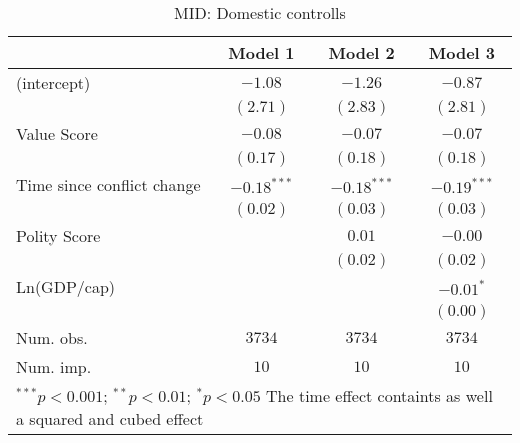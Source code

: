
\begin{table}
\begin{center}
\begin{tabular}{l c c c}
\toprule
 & Model 1 & Model 2 & Model 3 \\
\midrule
(intercept)                & $-1.08$       & $-1.26$       & $-0.87$       \\
                           & $(2.71)$      & $(2.83)$      & $(2.81)$      \\
Value Score                & $-0.08$       & $-0.07$       & $-0.07$       \\
                           & $(0.17)$      & $(0.18)$      & $(0.18)$      \\
Time since conflict change & $-0.18^{***}$ & $-0.18^{***}$ & $-0.19^{***}$ \\
                           & $(0.02)$      & $(0.03)$      & $(0.03)$      \\
Polity Score               &               & $0.01$        & $-0.00$       \\
                           &               & $(0.02)$      & $(0.02)$      \\
Ln(GDP/cap)                &               &               & $-0.01^{*}$   \\
                           &               &               & $(0.00)$      \\
\midrule
Num. obs.                  & $3734$        & $3734$        & $3734$        \\
Num. imp.                  & $10$          & $10$          & $10$          \\
\bottomrule
\multicolumn{4}{l}{\scriptsize{$^{***}p<0.001$; $^{**}p<0.01$; $^{*}p<0.05$ 
                  The time effect containts as well a squared and cubed effect}}
\end{tabular}
\caption{MID: Domestic controlls}
\label{MID_1}
\end{center}
\end{table}
